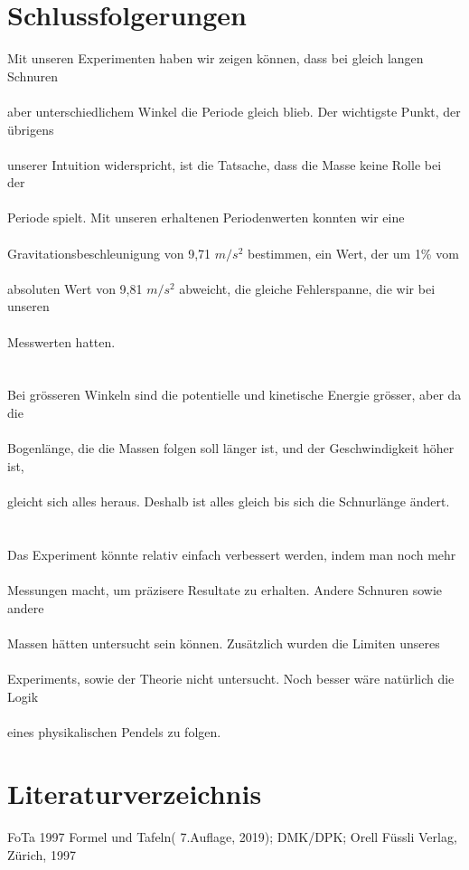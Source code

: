 \documentclass[12pt, a4paper, twoside]{article}
\begin{document}
        \section{Schlussfolgerungen}
        Mit unseren Experimenten haben wir zeigen können, dass bei gleich langen Schnuren\\\\
        aber unterschiedlichem Winkel die Periode gleich blieb. Der wichtigste Punkt, der übrigens\\\\
        unserer Intuition widerspricht, ist die Tatsache, dass die Masse keine Rolle bei der\\\\
        Periode spielt. Mit unseren erhaltenen Periodenwerten konnten wir eine\\\\
        Gravitationsbeschleunigung von 9,71 $m/s^2$  bestimmen, ein Wert, der um 1\% vom \\\\
        absoluten Wert von 9,81 $m/s^2$ abweicht, die gleiche Fehlerspanne, die wir bei unseren\\\\
        Messwerten hatten.\\\\\\
        Bei grösseren Winkeln sind die potentielle und kinetische Energie grösser, aber da die\\\\
        Bogenlänge, die die Massen folgen soll länger ist, und der Geschwindigkeit höher ist,\\\\
        gleicht sich alles heraus. Deshalb ist alles gleich bis sich die Schnurlänge ändert.\\\\\\
        Das Experiment könnte relativ einfach verbessert werden, indem man noch mehr\\\\
        Messungen macht, um präzisere Resultate zu erhalten. Andere Schnuren sowie andere \\\\
        Massen hätten untersucht sein können. Zusätzlich wurden die Limiten unseres \\\\
        Experiments, sowie der Theorie nicht untersucht. Noch besser wäre natürlich die Logik\\\\
        eines physikalischen Pendels zu folgen.
        \newpage
        \section{Literaturverzeichnis}
        \small
        FoTa 1997      Formel und Tafeln( 7.Auflage, 2019); DMK/DPK; Orell Füssli Verlag, Zürich, 1997
        
\end{document}
